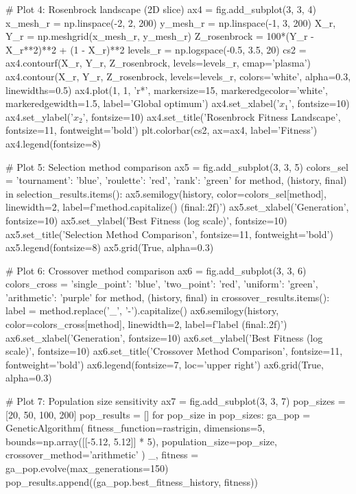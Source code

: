 \documentclass[a4paper, 11pt]{article}
\begin{document}
\begin{pycode}
# Plot 4: Rosenbrock landscape (2D slice)
ax4 = fig.add_subplot(3, 3, 4)
x_mesh_r = np.linspace(-2, 2, 200)
y_mesh_r = np.linspace(-1, 3, 200)
X_r, Y_r = np.meshgrid(x_mesh_r, y_mesh_r)
Z_rosenbrock = 100*(Y_r - X_r**2)**2 + (1 - X_r)**2
levels_r = np.logspace(-0.5, 3.5, 20)
cs2 = ax4.contourf(X_r, Y_r, Z_rosenbrock, levels=levels_r, cmap='plasma')
ax4.contour(X_r, Y_r, Z_rosenbrock, levels=levels_r, colors='white', alpha=0.3, linewidths=0.5)
ax4.plot(1, 1, 'r*', markersize=15, markeredgecolor='white', markeredgewidth=1.5, label='Global optimum')
ax4.set_xlabel('$x_1$', fontsize=10)
ax4.set_ylabel('$x_2$', fontsize=10)
ax4.set_title('Rosenbrock Fitness Landscape', fontsize=11, fontweight='bold')
plt.colorbar(cs2, ax=ax4, label='Fitness')
ax4.legend(fontsize=8)

# Plot 5: Selection method comparison
ax5 = fig.add_subplot(3, 3, 5)
colors_sel = {'tournament': 'blue', 'roulette': 'red', 'rank': 'green'}
for method, (history, final) in selection_results.items():
    ax5.semilogy(history, color=colors_sel[method], linewidth=2,
                 label=f'{method.capitalize()} ({final:.2f})')
ax5.set_xlabel('Generation', fontsize=10)
ax5.set_ylabel('Best Fitness (log scale)', fontsize=10)
ax5.set_title('Selection Method Comparison', fontsize=11, fontweight='bold')
ax5.legend(fontsize=8)
ax5.grid(True, alpha=0.3)

# Plot 6: Crossover method comparison
ax6 = fig.add_subplot(3, 3, 6)
colors_cross = {'single_point': 'blue', 'two_point': 'red',
                'uniform': 'green', 'arithmetic': 'purple'}
for method, (history, final) in crossover_results.items():
    label = method.replace('_', '-').capitalize()
    ax6.semilogy(history, color=colors_cross[method], linewidth=2,
                 label=f'{label} ({final:.2f})')
ax6.set_xlabel('Generation', fontsize=10)
ax6.set_ylabel('Best Fitness (log scale)', fontsize=10)
ax6.set_title('Crossover Method Comparison', fontsize=11, fontweight='bold')
ax6.legend(fontsize=7, loc='upper right')
ax6.grid(True, alpha=0.3)

# Plot 7: Population size sensitivity
ax7 = fig.add_subplot(3, 3, 7)
pop_sizes = [20, 50, 100, 200]
pop_results = []
for pop_size in pop_sizes:
    ga_pop = GeneticAlgorithm(
        fitness_function=rastrigin,
        dimensions=5,
        bounds=np.array([[-5.12, 5.12]] * 5),
        population_size=pop_size,
        crossover_method='arithmetic'
    )
    _, fitness = ga_pop.evolve(max_generations=150)
    pop_results.append((ga_pop.best_fitness_history, fitness))


\end{pycode}
\end{document}
